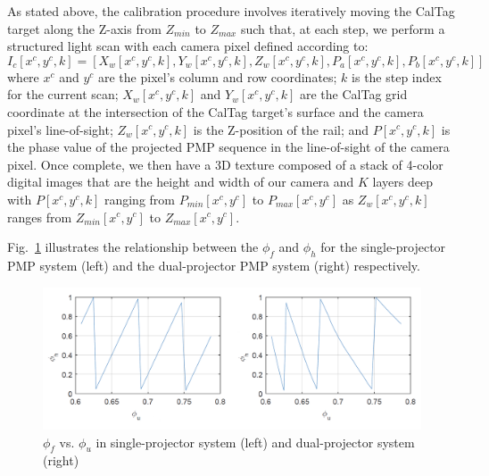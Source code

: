 \documentclass[]{spie}  %
\begin{document}
As stated above, the calibration procedure involves iteratively moving the CalTag target along the Z-axis from $Z_{min}$ to $Z_{max}$ such that, at each step, we perform a structured light scan with each camera pixel defined according to:
\begin{equation}
I_c[x^c, y^c, k] = [X_w[x^c, y^c, k], Y_w[x^c, y^c, k], Z_w[x^c, y^c, k], P_a[x^c, y^c, k], P_b[x^c, y^c, k]]
\label{calEqn}
\end{equation}
where $x^c$ and $y^c$ are the pixel’s column and row coordinates; $k$ is the step index for the current scan; $X_w[x^c, y^c, k]$ and $Y_w[x^c, y^c, k]$ are the CalTag grid coordinate at the intersection of the CalTag target’s surface and the camera pixel’s line-of-sight; $Z_w[x^c, y^c, k]$ is the Z-position of the rail; and $P[x^c, y^c, k]$ is the phase value of the projected PMP sequence in the line-of-sight of the camera pixel.  Once complete, we then have a 3D texture composed of a stack of 4-color digital images that are the height and width of our camera and $K$ layers deep with $P[x^c, y^c, k]$ ranging from $P_{min}[x^c, y^c]$ to $P_{max}[x^c, y^c]$ as $Z_w[x^c, y^c, k]$ ranges from $Z_{min}[x^c, y^c]$ to $Z_{max}[x^c, y^c]$.

Fig.~\ref{Fig:3} illustrates the relationship between the $\phi_f$ and $\phi_h$ for the single-projector PMP system (left) and the dual-projector PMP system (right) respectively.
\begin{figure}[!t]
  \includegraphics[width=\linewidth]{phase.png}
  \caption{$\phi_f$ vs. $\phi_u$ in single-projector system (left) and dual-projector system (right)}
  \label{Fig:3}
\end{figure}
\end{document}
